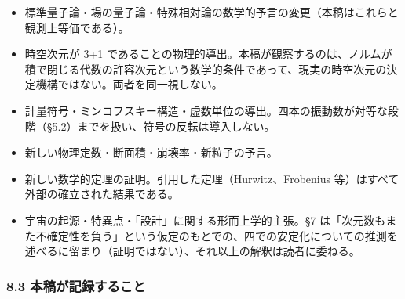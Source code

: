 \documentclass[
]{ltjsarticle}
\providecommand{\tightlist}{%
  \setlength{\itemsep}{0pt}\setlength{\parskip}{0pt}}
\begin{document}
\begin{itemize}
\tightlist
\item
  標準量子論・場の量子論・特殊相対論の数学的予言の変更（本稿はこれらと観測上等価である）。
\item
  時空次元が 3+1
  であることの物理的導出。本稿が観察するのは、ノルムが積で閉じる代数の許容次元という数学的条件であって、現実の時空次元の決定機構ではない。両者を同一視しない。
\item
  計量符号・ミンコフスキー構造・虚数単位の導出。四本の振動数が対等な段階（§5.2）までを扱い、符号の反転は導入しない。
\item
  新しい物理定数・断面積・崩壊率・新粒子の予言。
\item
  新しい数学的定理の証明。引用した定理（Hurwitz、Frobenius
  等）はすべて外部の確立された結果である。
\item
  宇宙の起源・特異点・「設計」に関する形而上学的主張。§7
  は「次元数もまた不確定性を負う」という仮定のもとでの、四での安定化についての推測を述べるに留まり（証明ではない）、それ以上の解釈は読者に委ねる。
\end{itemize}

\subsubsection{8.3
本稿が記録すること}\label{ux672cux7a3fux304cux8a18ux9332ux3059ux308bux3053ux3068}
\end{document}
